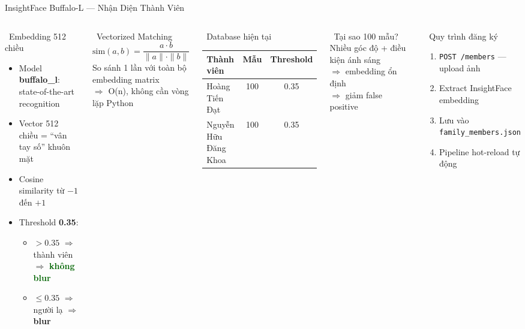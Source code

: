 \documentclass[aspectratio=169, 11pt]{beamer}
\begin{document}
\begin{frame}{InsightFace Buffalo-L --- Nhận Diện Thành Viên}
\begin{columns}[T]
\begin{block}{\faBrain\ Embedding 512 chiều}
\begin{itemize}\footnotesize
  \item Model \textbf{buffalo\_l}: state-of-the-art recognition
  \item Vector 512 chiều = ``vân tay số'' khuôn mặt
  \item Cosine similarity từ $-1$ đến $+1$
  \item Threshold \textbf{0.35}:
  \begin{itemize}\scriptsize
    \item $> 0.35$ $\Rightarrow$ thành viên $\Rightarrow$ \textcolor{darkgreen}{\textbf{không blur}}
    \item $\leq 0.35$ $\Rightarrow$ người lạ $\Rightarrow$ \textcolor{accent}{\textbf{blur}}
  \end{itemize}
\end{itemize}
\end{block}
\begin{block}{\faChartBar\ Vectorized Matching}
\footnotesize
$$\text{sim}(a,b) = \frac{a \cdot b}{\|a\| \cdot \|b\|}$$
So sánh 1 lần với toàn bộ embedding matrix\\
$\Rightarrow$ O(n), không cần vòng lặp Python
\end{block}
\begin{block}{\faDatabase\ Database hiện tại}
\footnotesize\renewcommand{\arraystretch}{1.4}
\begin{tabular}{lcc}
\textbf{Thành viên} & \textbf{Mẫu} & \textbf{Threshold} \\
\hline
Hoàng Tiến Đạt & 100 & 0.35 \\
Nguyễn Hữu Đăng Khoa & 100 & 0.35 \\
\end{tabular}
\end{block}
\begin{alertblock}{\faLightbulb\ Tại sao 100 mẫu?}
\footnotesize
Nhiều góc độ + điều kiện ánh sáng\\
$\Rightarrow$ embedding ổn định\\
$\Rightarrow$ giảm false positive
\end{alertblock}
\begin{block}{\faArrowRight\ Quy trình đăng ký}
\footnotesize
\begin{enumerate}\scriptsize
  \item \texttt{POST /members} — upload ảnh
  \item Extract InsightFace embedding
  \item Lưu vào \texttt{family\_members.json}
  \item Pipeline hot-reload tự động
\end{enumerate}
\end{block}
\end{columns}
\end{frame}
\end{document}
